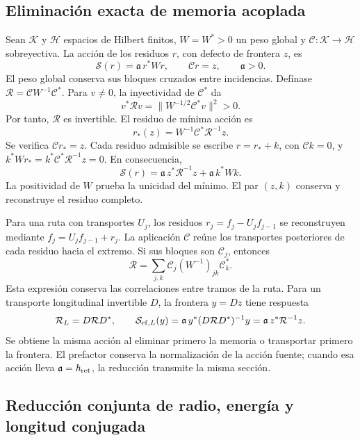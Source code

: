 \subsection{Eliminación exacta de memoria acoplada}

Sean \(\mathcal K\) y \(\mathcal H\) espacios de Hilbert finitos,
\(W=W^*>0\) un peso global y
\(\mathcal C:\mathcal K\to\mathcal H\) sobreyectiva. La acción
de los residuos \(r\), con defecto de frontera \(z\), es
\[
 \mathcal S(r)=\mathfrak a\,r^*Wr,
 \qquad \mathcal Cr=z,\qquad \mathfrak a>0.
\]
El peso global conserva sus bloques cruzados entre incidencias. Defínase
\(\mathcal R=\mathcal CW^{-1}\mathcal C^*\). Para \(v\ne0\),
la inyectividad de \(\mathcal C^*\) da
\[
 v^*\mathcal Rv=\|W^{-1/2}\mathcal C^*v\|^2>0.
\]
Por tanto, \(\mathcal R\) es invertible. El residuo de mínima acción es
\[
 r_*(z)=W^{-1}\mathcal C^*\mathcal R^{-1}z.
\]
Se verifica \(\mathcal Cr_*=z\). Cada residuo admisible se escribe
\(r=r_*+k\), con \(\mathcal Ck=0\), y
\(k^*Wr_*=k^*\mathcal C^*\mathcal R^{-1}z=0\). En consecuencia,
\begin{equation}
 \mathcal S(r)=\mathfrak a\,z^*\mathcal R^{-1}z
             +\mathfrak a\,k^*Wk.
 \label{g26:eq:accion-residuo-es}
\end{equation}
La positividad de \(W\) prueba la unicidad del mínimo. El par
\((z,k)\) conserva y reconstruye el residuo completo.

Para una ruta con transportes \(U_j\), los residuos
\(r_j=f_j-U_jf_{j-1}\) se reconstruyen mediante
\(f_j=U_jf_{j-1}+r_j\). La aplicación \(\mathcal C\) reúne los
transportes posteriores de cada residuo hacia el extremo. Si sus
bloques son \(\mathcal C_j\), entonces
\[
 \mathcal R=\sum_{j,k}\mathcal C_j(W^{-1})_{jk}\mathcal C_k^*.
\]
Esta expresión conserva las correlaciones entre tramos de la ruta.
Para un transporte longitudinal invertible \(D\), la frontera
\(y=Dz\) tiene respuesta
\[
 \mathcal R_L=D\mathcal RD^*,\qquad
 \mathcal S_{{\rm ef},L}(y)
 =\mathfrak a\,y^*(D\mathcal RD^*)^{-1}y
 =\mathfrak a\,z^*\mathcal R^{-1}z.
\]
Se obtiene la misma acción al eliminar primero la memoria o transportar
primero la frontera. El prefactor conserva la normalización de la acción
fuente; cuando esa acción lleva \(\mathfrak a=\hbar_{\rm ret}\), la
reducción transmite la misma sección.

\subsection{Reducción conjunta de radio, energía y longitud conjugada}

